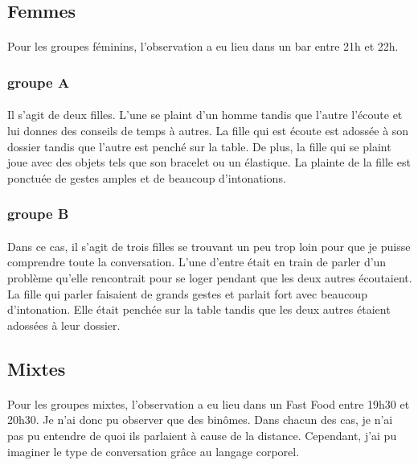 \subsection{Femmes}
\paragraph{}
Pour les groupes féminins, l’observation a eu lieu dans un bar entre 21h et 22h.
\subsubsection{groupe A}
\paragraph{}
	Il s’agit de deux filles. L’une se plaint d’un homme tandis que l’autre l’écoute et lui donnes des conseils de temps à autres. La fille qui est écoute est adossée à son dossier tandis que l’autre est penché sur la table. De plus, la fille qui se plaint joue avec des objets tels que son bracelet ou un élastique. La plainte de la fille est ponctuée de gestes amples et de beaucoup d’intonations.
\subsubsection{groupe B}
\paragraph{}
	Dans ce cas, il s’agit de trois filles se trouvant un peu trop loin pour que je puisse comprendre toute la conversation. L’une d’entre était en train de parler d’un problème qu’elle rencontrait pour se loger pendant que les deux autres écoutaient. La fille qui parler faisaient de grands gestes et parlait fort avec beaucoup d’intonation. Elle était penchée sur la table tandis que les deux autres étaient adossées à leur dossier. 

\subsection{Mixtes}
\paragraph{}
Pour les groupes mixtes, l’observation a eu lieu dans un Fast Food entre 19h30 et 20h30. Je n’ai donc pu observer que des binômes. Dans chacun des cas, je n’ai pas pu entendre de quoi ils parlaient à cause de la distance. Cependant, j’ai pu imaginer le type de conversation grâce au langage corporel.
